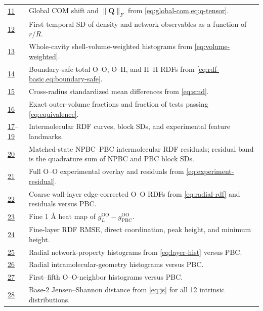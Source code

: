 \documentclass[11pt]{article}
\newcommand{\angstrom}{\text{\AA}}
\newcommand{\PBC}{\mathrm{PBC}}
\newcommand{\OO}{\mathrm{OO}}
\begin{document}
\begin{longtable}{p{}p{}}
\hyperref[fig:s11-global]{11} & Global COM shift and \(\|\bm Q\|_F\) from \cref{eq:global-com,eq:q-tensor}.\\
\hyperref[fig:s12-temporal-sd]{12} & First temporal SD of density and network observables as a function of \(r/R\).\\
\hyperref[fig:s13-distributions]{13} & Whole-cavity shell-volume-weighted histograms from \cref{eq:volume-weighted}.\\
\hyperref[fig:s14-rdf-total]{14} & Boundary-safe total O--O, O--H, and H--H RDFs from \cref{eq:rdf-basic,eq:boundary-safe}.\\
\hyperref[fig:s15-equivalence-smd]{15} & Cross-radius standardized mean differences from \cref{eq:smd}.\\
\hyperref[fig:s16-equivalence-geometry]{16} & Exact outer-volume fractions and fraction of tests passing \cref{eq:equivalence}.\\
\hyperref[fig:s17-goo-exp]{17}--\hyperref[fig:s19-ghh-exp]{19} & Intermolecular RDF curves, block SDs, and experimental feature landmarks.\\
\hyperref[fig:s20-npbc-pbc]{20} & Matched-state NPBC--PBC intermolecular RDF residuals; residual band is the quadrature sum of NPBC and PBC block SDs.\\
\hyperref[fig:s21-goo-full-exp]{21} & Full O--O experimental overlay and residuals from \cref{eq:experiment-residual}.\\
\hyperref[fig:s22-radial-goo]{22} & Coarse wall-layer edge-corrected O--O RDFs from \cref{eq:radial-rdf} and residuals versus PBC.\\
\hyperref[fig:s23-radial-goo-heatmap]{23} & Fine 1 \(\angstrom\) heat map of \(g_L^{\OO}-g_{\PBC}^{\OO}\).\\
\hyperref[fig:s24-radial-goo-metrics]{24} & Fine-layer RDF RMSE, direct coordination, peak height, and minimum height.\\
\hyperref[fig:s25-network-hists]{25} & Radial network-property histograms from \cref{eq:layer-hist} versus PBC.\\
\hyperref[fig:s26-intra-hists]{26} & Radial intramolecular-geometry histograms versus PBC.\\
\hyperref[fig:s27-neighbor-hists]{27} & First--fifth O--O-neighbor histograms versus PBC.\\
\hyperref[fig:s28-js]{28} & Base-2 Jensen--Shannon distance from \cref{eq:js} for all 12 intrinsic distributions.\\
\bottomrule
\end{longtable}
\end{document}
